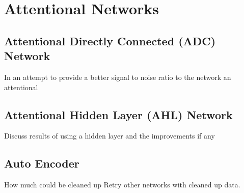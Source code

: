 \chapter{Attentional Networks}
\label{ch:attentional}

\section{Attentional Directly Connected (ADC) Network}

In an attempt to provide a better signal to noise ratio to the network an attentional

\section{Attentional Hidden Layer (AHL) Network}

Discuss results of using a hidden layer and the improvements if any


\section{Auto Encoder}
How much could be cleaned up
Retry other networks with cleaned up data.

